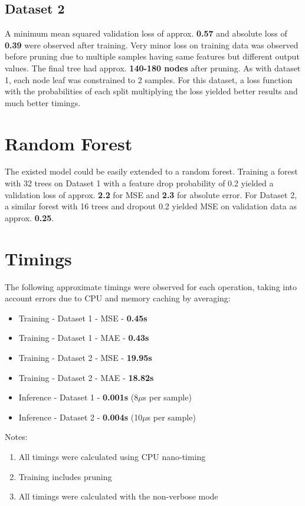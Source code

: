 \documentclass{article}
\begin{document}



\subsection{Dataset 2}
A minimum mean squared validation loss of approx. \textbf{0.57} and absolute loss of \textbf{0.39} were observed after training. Very minor loss on training data was observed before pruning due to multiple samples having same features but different output values. The final tree had approx. \textbf{140-180 nodes} after pruning. As with dataset 1, each node leaf was constrained to 2 samples. For this dataset, a loss function with the probabilities of each split multiplying the loss yielded better results and much better timings.




\newpage

\section{Random Forest}
The existed model could be easily extended to a random forest. Training a forest with 32 trees on Dataset 1 with a feature drop probability of 0.2 yielded a validation loss of approx. \textbf{2.2} for MSE and \textbf{2.3} for absolute error. For Dataset 2, a similar forest with 16 trees and dropout 0.2 yielded MSE on validation data as approx. \textbf{0.25}.

\vspace{2mm}



\section{Timings}
The following approximate timings were observed for each operation, taking into account errors due to CPU and memory caching by averaging:
\begin{itemize}
	\item Training - Dataset 1 - MSE - \textbf{0.45s}
	\item Training - Dataset 1 - MAE - \textbf{0.43s}
	\item Training - Dataset 2 - MSE - \textbf{19.95s}
	\item Training - Dataset 2 - MAE - \textbf{18.82s}
	\item Inference - Dataset 1 - \textbf{0.001s} (8$\mu$s per sample)
	\item Inference - Dataset 2 - \textbf{0.004s} (10$\mu$s per sample)
\end{itemize}
Notes:
\begin{enumerate}
	\item All timings were calculated using CPU nano-timing
	\item Training includes pruning
	\item All timings were calculated with the non-verbose mode
\end{enumerate}
\end{document}
